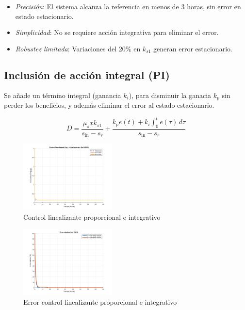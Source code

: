 \documentclass[letterpaper, 10 pt, conference]{ieeeconf}  %
\begin{document}
\begin{itemize}  
    \item \textit{Precisión}: El sistema alcanza la referencia en menos de 3 horas, sin error en estado estacionario.  
    \item \textit{Simplicidad}: No se requiere acción integrativa para eliminar el error.  
    \item \textit{Robustez limitada}: Variaciones del \(20\%\) en \(k_{s1}\) generan error estacionario.
\end{itemize}  

\subsection{Inclusión de acción integral (PI)}  
Se añade un término integral (ganancia \(k_i\)), para disminuir la ganacia \(k_p\) sin perder los beneficios, y además eliminar el error al estado estacionario.

\begin{equation}
D = \frac{\mu_s x k_{s1}}{s_{\text{in}} - s_r} + \frac{k_p e(t) + k_i \int_{0}^{t} e(\tau) \, d\tau}{s_{\text{in}} - s_r}
\end{equation}

\begin{figure}[H]
  \centering
  \includegraphics[width=0.43\textwidth]{./Images_tp3/lin_ki.png}
  \caption{Control linealizante proporcional e integrativo}
\end{figure}
\begin{figure}[H]
  \centering
  \includegraphics[width=0.43\textwidth]{./Images_tp3/lin_ki_err.png}
  \caption{Error control linealizante proporcional e integrativo}
\end{figure}
\end{document}
